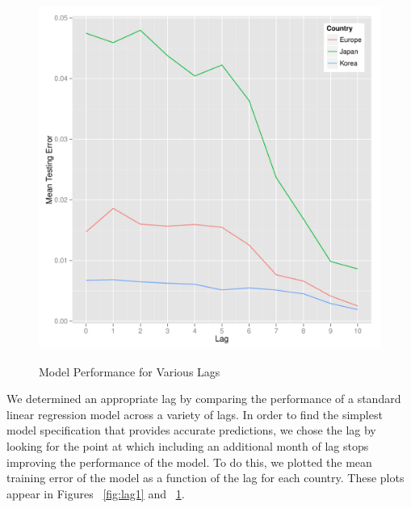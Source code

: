 \documentclass{sig-alternate-05-2015}
\begin{document}
\begin{figure}
\centering
\caption{Model Performance for Various Lags}
\includegraphics[scale=0.45]{lag2.pdf}
\label{fig:lag2}
\end{figure}



We determined an appropriate lag by comparing the performance of a standard linear regression model across a variety of lags. In order to find the simplest model specification that provides accurate predictions, we chose the lag by looking for the point at which including an additional month of lag stops improving the performance of the model. To do this, we plotted the mean training error of the model as a function of the lag for each country. These plots appear in Figures ~\ref{fig:lag1} and ~\ref{fig:lag2}. %
\end{document}
